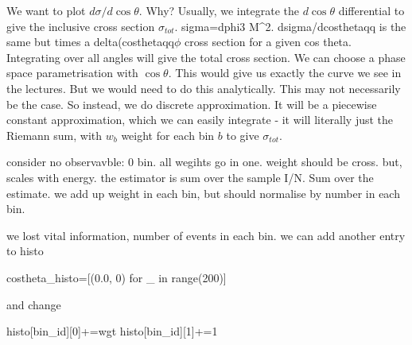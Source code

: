\color{red}
We want to plot $d\sigma/d\cos\theta$. Why? Usually, we integrate the  $d\cos\theta$ differential to give the inclusive cross section $\sigma_{tot}$. sigma=dphi3 M^2. dsigma/dcosthetaqq is the same but times a delta(costhetaqq$\phi$ cross section for a given cos theta. Integrating over all angles will give the total cross section. We can choose a phase space parametrisation with $\cos\theta$. This would give us exactly the curve we see in the lectures. But we would need to do this analytically. This may not necessarily be the case. So instead, we do discrete approximation. It will be a piecewise constant approximation, which we can easily integrate - it will literally just the Riemann sum, with $w_b$ weight for each bin $b$ to give $\sigma_{tot}$.


consider no observavble: 0 bin. all wegihts go in one. weight should be cross. but, scales with energy. the estimator is sum over the sample I/N. Sum over the estimate. we add up weight in each bin, but should normalise by number in each bin.

we lost vital information, number of events in each bin. we can add another entry to histo

\begin{codeenv}
        costheta_histo=[(0.0, 0) for _ in range(200)]
\end{codeenv}
and change 
            \begin{codeenv}
histo[bin_id][0]+=wgt
histo[bin_id][1]+=1
            \end{codeenv}
\color{black}
